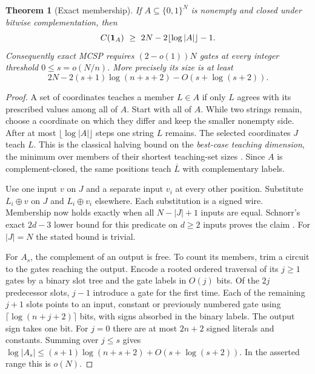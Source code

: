 \documentclass[11pt]{article}
\newtheorem{theorem}{Theorem}
\begin{document}
\begin{theorem}[Exact membership]\label{thm:exact}
If $A\subseteq\{0,1\}^N$ is nonempty and closed under bitwise complementation, then
\[
 C({\bf1}_A)\ \ge\ 2N-2\lfloor\log |A|\rfloor-1.
\]
Consequently exact MCSP requires $(2-o(1))N$ gates at every integer threshold $0\le s=o(N/n)$. More precisely its size is at least
\[
 2N-2(s+1)\log(n+s+2)-O(s+\log(s+2)).
\]
\end{theorem}
\begin{proof}
A set of coordinates teaches a member $L\in A$ if only $L$ agrees with its prescribed values among all of $A$. Start with all of $A$. While two strings remain, choose a coordinate on which they differ and keep the smaller nonempty side. After at most $\lfloor\log |A|\rfloor$ steps one string $L$ remains. The selected coordinates $J$ teach $L$. This is the classical halving bound on the \emph{best-case teaching dimension}, the minimum over members of their shortest teaching-set sizes \cite{teaching}. Since $A$ is complement-closed, the same positions teach $\overline L$ with complementary labels.

Use one input $v$ on $J$ and a separate input $v_i$ at every other position. Substitute $L_i\oplus v$ on $J$ and $L_i\oplus v_i$ elsewhere. Each substitution is a signed wire. Membership now holds exactly when all $N-|J|+1$ inputs are equal. Schnorr's exact $2d-3$ lower bound for this predicate on $d\ge2$ inputs proves the claim \cite{schnorr}. For $|J|=N$ the stated bound is trivial.

For $A_s$, the complement of an output is free. To count its members, trim a circuit to the gates reaching the output. Encode a rooted ordered traversal of its $j\ge1$ gates by a binary slot tree and the gate labels in $O(j)$ bits. Of the $2j$ predecessor slots, $j-1$ introduce a gate for the first time. Each of the remaining $j+1$ slots points to an input, constant or previously numbered gate using $\lceil\log(n+j+2)\rceil$ bits, with signs absorbed in the binary labels. The output sign takes one bit. For $j=0$ there are at most $2n+2$ signed literals and constants. Summing over $j\le s$ gives $\log|A_s|\le(s+1)\log(n+s+2)+O(s+\log(s+2))$. In the asserted range this is $o(N)$.
\end{proof}
\end{document}
